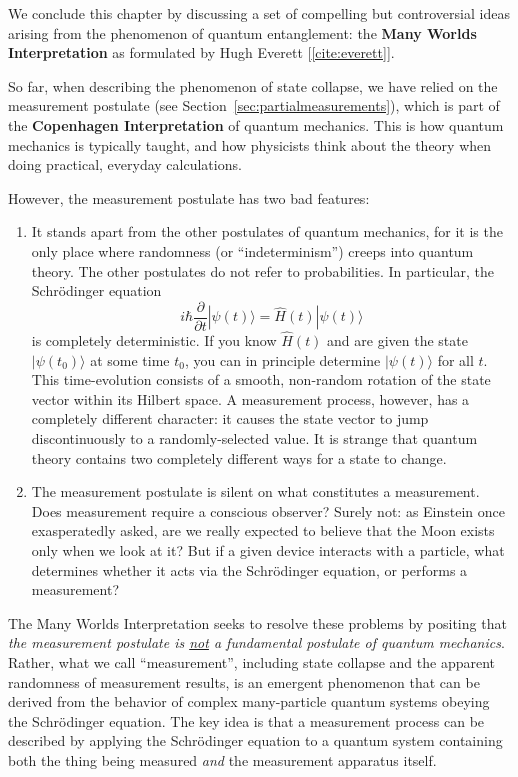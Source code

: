 \documentclass[pra,12pt]{revtex4}
\begin{document}
We conclude this chapter by discussing a set of compelling but
controversial ideas arising from the phenomenon of quantum
entanglement: the \textbf{Many Worlds Interpretation} as formulated by
Hugh Everett [\ref{cite:everett}].

So far, when describing the phenomenon of state collapse, we have
relied on the measurement postulate (see
Section~\ref{sec:partialmeasurements}), which is part of the
\textbf{Copenhagen Interpretation} of quantum mechanics.  This is how
quantum mechanics is typically taught, and how physicists think about
the theory when doing practical, everyday calculations.

However, the measurement postulate has two bad features:

\begin{enumerate}
\item It stands apart from the other postulates of quantum mechanics,
  for it is the only place where randomness (or ``indeterminism'')
  creeps into quantum theory.  The other postulates do not refer to
  probabilities.  In particular, the Schr\"odinger equation
\begin{equation}
  i\hbar\frac{\partial}{\partial t}|\psi(t)\rangle = \hat{H}(t) |\psi(t)\rangle
\end{equation}
is completely deterministic.  If you know $\hat{H}(t)$ and are given
the state $|\psi(t_0)\rangle$ at some time $t_0$, you can in principle
determine $|\psi(t)\rangle$ for all $t$.  This time-evolution consists
of a smooth, non-random rotation of the state vector within its
Hilbert space.  A measurement process, however, has a completely
different character: it causes the state vector to jump
discontinuously to a randomly-selected value.  It is strange that
quantum theory contains two completely different ways for a state to
change.

\item The measurement postulate is silent on what constitutes a
measurement.  Does measurement require a conscious observer?  Surely
not: as Einstein once exasperatedly asked, are we really expected to
believe that the Moon exists only when we look at it?  But if a given
device interacts with a particle, what determines whether it acts via
the Schr\"odinger equation, or performs a measurement?
\end{enumerate}

The Many Worlds Interpretation seeks to resolve these problems by
positing that \textit{the measurement postulate is \underline{not} a
  fundamental postulate of quantum mechanics}.  Rather, what we call
``measurement'', including state collapse and the apparent randomness
of measurement results, is an emergent phenomenon that can be derived
from the behavior of complex many-particle quantum systems obeying the
Schr\"odinger equation.  The key idea is that a measurement process
can be described by applying the Schr\"odinger equation to a quantum
system containing both the thing being measured \textit{and} the
measurement apparatus itself.
\end{document}
